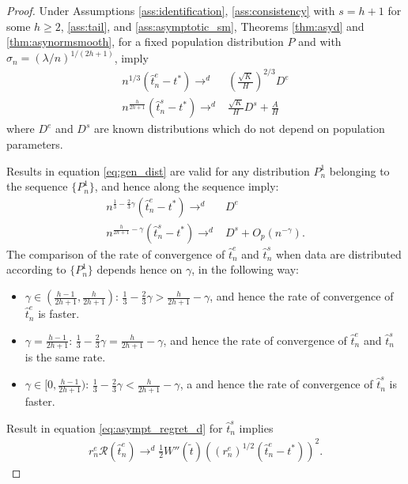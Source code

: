{\begin{proof}
    Under Assumptions \ref{ass:identification}, \ref{ass:consistency} with $s=h + 1$ for some $h\geq 2$, \ref{ass:tail}, and \ref{ass:asymptotic_sm}, Theorems \ref{thm:asyd} and \ref{thm:asynormsmooth}, for a fixed population distribution $P$ and with $\sigma_n = (\lambda/n)^{1/(2h +1)}$, imply
\begin{align} \label{eq:gen_dist}
    n^{1 / 3}\left(\hat{t}^e_n-t^*\right) \rightarrow^d& \left(\frac{\sqrt{K}}{H}\right)^{2/3} D^e \\
    n^{\frac{h}{2h + 1}}(\hat{t}^s_n - t^*) \rightarrow^d&  \frac{\sqrt{K}}{H} D^s + \frac{A}{H}
\end{align}
where $D^e$ and $D^s$ are known distributions which do not depend on population parameters.

Results in equation \eqref{eq:gen_dist} are valid for any distribution $P^1_n$ belonging to the sequence $\{P^1_n\}$, and hence along the sequence imply:
\begin{align*}
    n^{\frac{1}{3} - \frac{2}{3} \gamma} \left(\hat{t}^e_n-t^*\right) \rightarrow^d&  D^e \\
    n^{\frac{h}{2h + 1} - \gamma}(\hat{t}^s_n - t^*) \rightarrow^d& D^s + O_p(n^{- \gamma}).
\end{align*}
The comparison of the rate of convergence of $\hat{t}^e_n$ and $\hat{t}^s_n$ when data are distributed according to $\{P^1_n\}$ depends hence on $\gamma$, in the following way:
\begin{itemize}
    \item $\gamma \in (\frac{h-1}{2h + 1}, \frac{h}{2h + 1})$: $\frac{1}{3} - \frac{2}{3} \gamma > \frac{h}{2h + 1} - \gamma$, and hence the rate of convergence of $\hat{t}^e_n$ is faster.
    \item $\gamma = \frac{h-1}{2h + 1} $: $\frac{1}{3} - \frac{2}{3} \gamma = \frac{h}{2h + 1} - \gamma$, and hence the rate of convergence of $\hat{t}^e_n$ and $\hat{t}^s_n$ is the same rate.
    \item $\gamma \in [0,\frac{h-1}{2h + 1})$: $\frac{1}{3} - \frac{2}{3} \gamma < \frac{h}{2h + 1} - \gamma$, a and hence the rate of convergence of $\hat{t}^s_n$ is faster.
\end{itemize}
 Result in equation \eqref{eq:asympt_regret_d} for $\hat{t}^s_n$ implies
    \begin{gather*}
        r_n^e \mathcal{R}(\hat{t}^e_n) \rightarrow^d \frac{1}{2} W''(\tilde{t}) \left( (r_n^e)^{1/2} \left(\hat{t}^e_n-t^*\right) \right)^2.
    \end{gather*}

\end{proof}}
